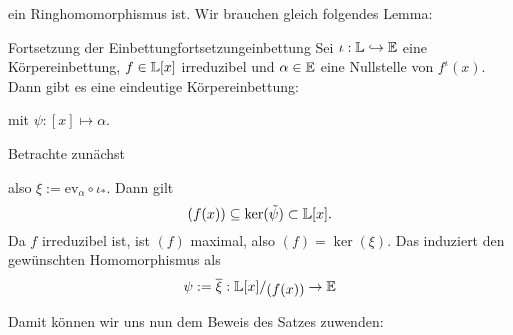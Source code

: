 ein Ringhomomorphismus ist. Wir brauchen gleich folgendes Lemma:
\begin{lemma}{Fortsetzung der Einbettung}{fortsetzungeinbettung}
Sei $\iota: \mathbb{L} \hookrightarrow \mathbb{E}$ eine Körpereinbettung, $f \in \mathbb{L}[x]$ irreduzibel und $\alpha \in \mathbb{E}$ eine Nullstelle von $f^\iota(x)$. Dann gibt es eine eindeutige Körpereinbettung:
\begin{center}
\end{center}
mit $\psi: [x] \mapsto \alpha$.
\end{lemma}
\begin{beweis}
Betrachte zunächst
\begin{center}
\end{center}
also $\xi := \text{ev}_\alpha \circ \iota_\ast$. Dann gilt
\begin{equation}
(f(x)) \subseteq \ker(\tilde{\psi}) \subset \mathbb{L}[x].
\end{equation}
Da $f$ irreduzibel ist, ist $(f)$ maximal, also $(f)=\ker(\xi)$. Das induziert den gewünschten Homomorphismus als
\begin{equation}
\psi:= \overline{\xi}: \quotient{\L[x]}{(f(x))} \to \E
\end{equation}
\end{beweis}
Damit können wir uns nun dem Beweis des Satzes zuwenden:
